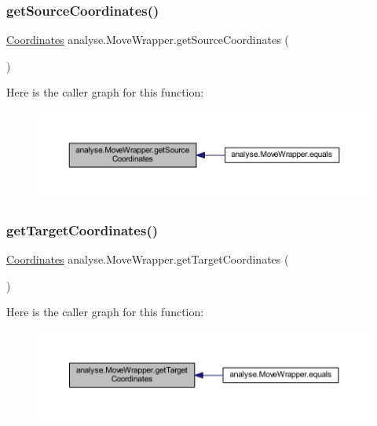 \subsubsection{\texorpdfstring{get\+Source\+Coordinates()}{getSourceCoordinates()}}
{\footnotesize\ttfamily \mbox{\hyperlink{classrule_engine_1_1_coordinates}{Coordinates}} analyse.\+Move\+Wrapper.\+get\+Source\+Coordinates (\begin{DoxyParamCaption}{ }\end{DoxyParamCaption})\hspace{0.3cm}{\ttfamily [inline]}}

Here is the caller graph for this function\+:
\nopagebreak
\begin{figure}[H]
\begin{center}
\leavevmode
\includegraphics[width=350pt]{classanalyse_1_1_move_wrapper_a626a8a9e56b2d1ec8d49d5d028e707c8_icgraph}
\end{center}
\end{figure}
\mbox{\label{classanalyse_1_1_move_wrapper_ae9b1716d7aeab0e925cdd62494667366}} 
\subsubsection{\texorpdfstring{get\+Target\+Coordinates()}{getTargetCoordinates()}}
{\footnotesize\ttfamily \mbox{\hyperlink{classrule_engine_1_1_coordinates}{Coordinates}} analyse.\+Move\+Wrapper.\+get\+Target\+Coordinates (\begin{DoxyParamCaption}{ }\end{DoxyParamCaption})\hspace{0.3cm}{\ttfamily [inline]}}

Here is the caller graph for this function\+:
\nopagebreak
\begin{figure}[H]
\begin{center}
\leavevmode
\includegraphics[width=350pt]{classanalyse_1_1_move_wrapper_ae9b1716d7aeab0e925cdd62494667366_icgraph}
\end{center}
\end{figure}


